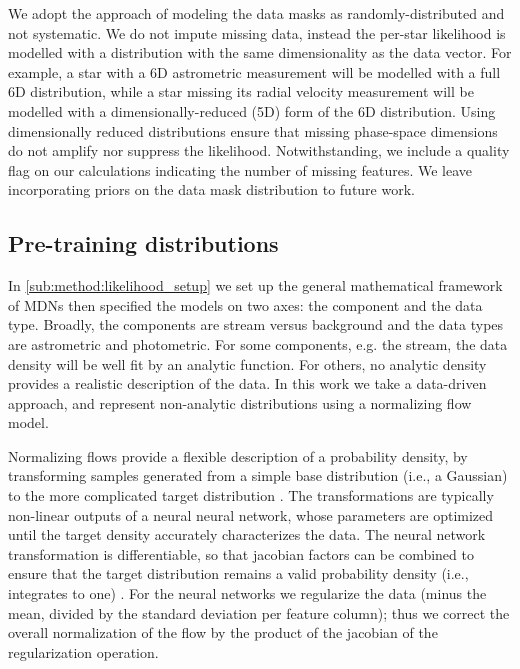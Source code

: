 \documentclass[twocolumn]{aastex631}
\begin{document}
        We adopt the approach of modeling the data masks as randomly-distributed
        and not systematic. We do not impute missing data, instead the per-star
        likelihood is modelled with a distribution with the same dimensionality
        as the data vector.  For example, a star with a 6D astrometric
        measurement will be modelled with a full 6D distribution, while a star
        missing its radial velocity measurement will be modelled with a
        dimensionally-reduced (5D) form of the 6D distribution. Using
        dimensionally reduced distributions ensure that missing phase-space
        dimensions do not amplify nor suppress the likelihood.  Notwithstanding,
        we include a quality flag on our calculations indicating the number of
        missing features.  We leave incorporating priors on the data mask
        distribution to future work. 


    \subsection{Pre-training distributions} 
    \label{sub:method:pre-training_distributions}

        In \autoref{sub:method:likelihood_setup} we set up the general
        mathematical framework of MDNs then specified the models on two axes:
        the component and the data type. Broadly, the components are stream
        versus background and the data types are astrometric and photometric.
        For some components, e.g. the stream, the data density will be well fit
        by an analytic function.  For others, no analytic density provides a
        realistic description of the data. In this work we take a data-driven
        approach, and represent non-analytic distributions using a normalizing
        flow model.

        Normalizing flows provide a flexible description of a probability
        density, by transforming samples generated from a simple base
        distribution (i.e., a Gaussian) to the more complicated target
        distribution \citep{EstebanVanden2010, Rippel2013, RezendeMohamed2015}.
        The transformations are typically non-linear outputs of a neural neural
        network, whose parameters are optimized until the target density
        accurately characterizes the data. The neural network transformation is
        differentiable, so that jacobian factors can be combined to ensure that
        the target distribution remains a valid probability density (i.e.,
        integrates to one) \citep{Kobyzev+2019}.  For the neural networks we
        regularize the data (minus the mean, divided by the standard deviation
        per feature column); thus we correct the overall normalization of the
        flow by the product of the jacobian of the regularization operation.
\end{document}
